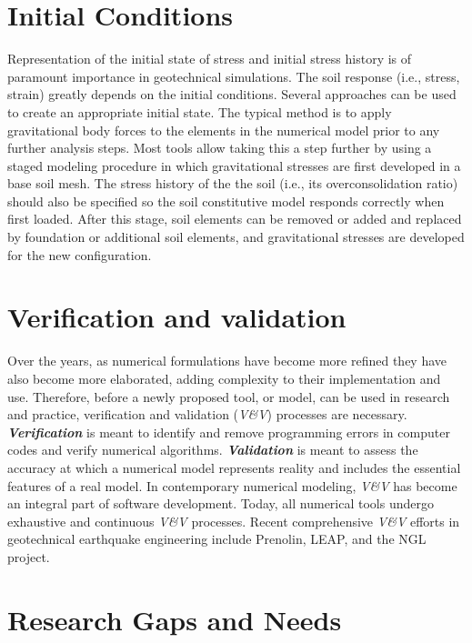 \section{Initial Conditions}
\label{sec:resp_geotech_6}

Representation of the initial state of stress and initial stress history is of paramount importance in geotechnical simulations. The soil response (i.e., stress, strain) greatly depends on the initial conditions. Several approaches can be used to create an appropriate initial state. The typical method is to apply gravitational body forces to the elements in the numerical model prior to any further analysis steps. Most tools allow taking this a step further by using a staged modeling procedure in which gravitational stresses are ﬁrst developed in a base soil mesh. The stress history of the the soil (i.e., its overconsolidation ratio) should also be specified so the soil constitutive model responds correctly when first loaded. After this stage, soil elements can be removed or added and replaced by foundation or additional soil elements, and gravitational stresses are developed for the new conﬁguration.

\section{Verification and validation} 
\label{sec:resp_geotech_7}

Over the years, as numerical formulations have become more refined they have also become more elaborated, adding complexity to their implementation and use. Therefore, before a newly proposed tool, or model, can be used in research and practice, verification and validation (\emph{V\&V}) processes are necessary. \textbf{\emph{Verification}} is meant to identify and remove programming errors in computer codes and verify numerical algorithms. \textbf{\emph{Validation}} is meant to assess the accuracy at which a numerical model represents reality and includes the essential features of a real model. In contemporary numerical modeling, \emph{V\&V} has become an integral part of software development. Today, all numerical tools undergo exhaustive and continuous \emph{V\&V} processes. Recent comprehensive \emph{V\&V} efforts in geotechnical earthquake engineering include Prenolin, LEAP, and the NGL project. 

\section{Research Gaps and Needs}
\label{sec:resp_geotech_8}

